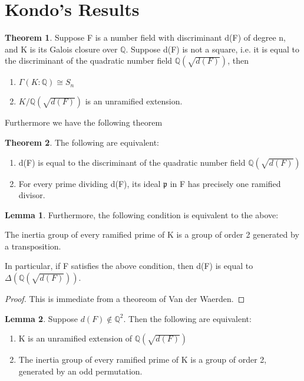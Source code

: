 \documentclass[12pt]{extarticle}
\newcommand{\<}{\langle}
\renewcommand{\>}{\rangle}
\theoremstyle{definition}
\newtheorem{theorem}{Theorem}
\newtheorem{lemma}{Lemma}
\begin{document}
\section{Kondo's Results}
\begin{theorem}
    Suppose F is a number field with discriminant d(F) of degree n, and K is its Galois closure over $\mathbb{Q}$. Suppose d(F) is not a square, i.e. it is equal to the discriminant of the quadratic number field $\mathbb{Q}(\sqrt{d(F)})$, then \begin{enumerate}
        \item $\Gamma(K:\mathbb{Q})\cong S_n$
        \item $K/\mathbb{Q}(\sqrt{d(F)})$ is an unramified extension.
    \end{enumerate}
\end{theorem}
Furthermore we have the following theorem \begin{theorem}
    The following are equivalent: \begin{enumerate}
        \item d(F) is equal to the discriminant of the quadratic number field $\mathbb{Q}(\sqrt{d(F)})$
        \item For every prime dividing d(F), its ideal $\mathfrak{p}$ in F has precisely one ramified divisor.
    \end{enumerate}
\end{theorem}
\begin{lemma}
Furthermore, the following condition is equivalent to the above:
\par
    The inertia group of every ramified prime of K is a group of order 2 generated by a transposition.\par
In particular, if F satisfies the above condition, then d(F) is equal to $\Delta(\mathbb{Q}(\sqrt{d(F)}))$.
\end{lemma}
\begin{proof}
This is immediate from a theoreom of Van der Waerden. 
\end{proof}
\begin{lemma}
Suppose $d(F)\notin \mathbb{Q}^2$. Then the following are equivalent:\begin{enumerate}
    \item K is an unramified extension of $\mathbb{Q}(\sqrt{d(F)})$
    \item The inertia group of every ramified prime of K is a group of order 2, generated by an odd permutation. 
\end{enumerate}
\end{lemma} 
\end{document}
